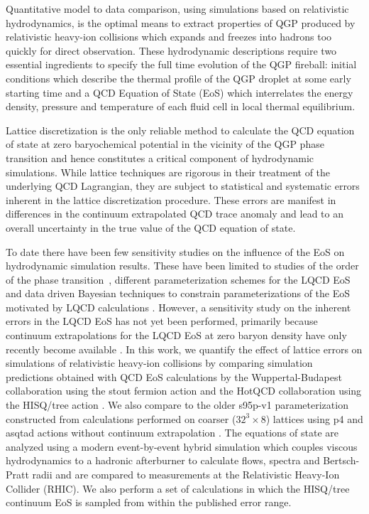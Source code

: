 \documentclass[aps,prc,reprint,amsmath,nofootinbib,superscriptaddress]{revtex4-1}
\begin{document}
Quantitative model to data comparison, using simulations based on relativistic hydrodynamics, is the optimal means to extract properties of QGP produced by relativistic heavy-ion collisions which expands and freezes into hadrons too quickly for direct observation. 
These hydrodynamic descriptions require two essential ingredients to specify the full time evolution of the QGP fireball: initial conditions which describe the thermal profile of the QGP droplet at some early starting time and a QCD Equation of State (EoS) which interrelates the energy density, pressure and temperature of each fluid cell in local thermal equilibrium.

Lattice discretization is the only reliable method to calculate the QCD equation of state at zero baryochemical potential in the vicinity of the QGP phase transition and hence constitutes a critical component of hydrodynamic simulations. 
While lattice techniques are rigorous in their treatment of the underlying QCD Lagrangian, they are subject to statistical and systematic errors inherent in the lattice discretization procedure. 
These errors are manifest in differences in the continuum extrapolated QCD trace anomaly and lead to an overall uncertainty in the true value of the QCD equation of state.

To date there have been few sensitivity studies on the influence of the EoS on hydrodynamic simulation results. 
These have been limited to studies of the order of the phase transition~\cite{Huovinen:2005gy}, different parameterization schemes for the LQCD EoS \cite{Huovinen:2009yb} and data driven Bayesian techniques to constrain parameterizations of the EoS motivated by LQCD calculations \cite{Pratt:2015zsa,Sangaline:2015isa}.
However, a sensitivity study on the inherent errors in the LQCD EoS has not yet been performed, primarily because continuum extrapolations for the LQCD EoS at zero baryon density have only recently become available \cite{Borsanyi:2013bia,Bazavov:2014pvz}. 
In this work, we quantify the effect of lattice errors on simulations of relativistic heavy-ion collisions by comparing simulation predictions obtained with QCD EoS calculations by the Wuppertal-Budapest collaboration using the stout fermion action \cite{Borsanyi:2013bia} and the HotQCD collaboration using the HISQ/tree action \cite{Bazavov:2014pvz}.  
We also compare to the older s95p-v1 parameterization \cite{Huovinen:2009yb} constructed from calculations performed on coarser ($32^3 \times 8$) lattices using p4 and asqtad actions without continuum extrapolation \cite{Bazavov:2009zn}.  
The equations of state are analyzed using a modern event-by-event hybrid simulation which couples viscous hydrodynamics to a hadronic afterburner to calculate flows, spectra and Bertsch-Pratt radii and are compared to measurements at the Relativistic Heavy-Ion Collider (RHIC).
We also perform a set of calculations in which the HISQ/tree continuum EoS is sampled from within the published error range.
\end{document}
